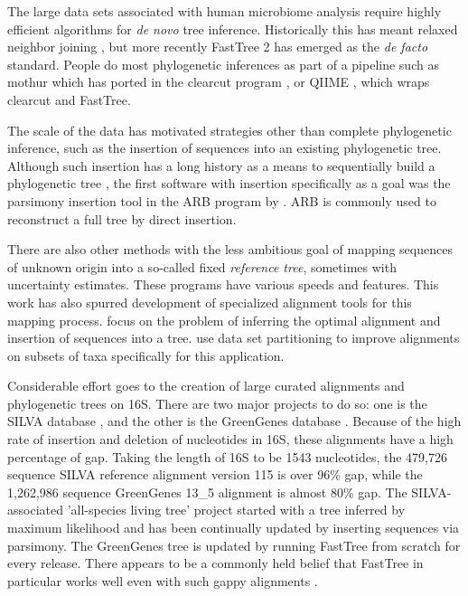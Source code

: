 \documentclass{amsart}
\begin{document}
The large data sets associated with human microbiome analysis require highly efficient algorithms for \emph{de novo} tree inference.
Historically this has meant relaxed neighbor joining \citep{evans2006relaxed}, but more recently FastTree 2 \citep{price2010fasttree} has emerged as the \textit{de facto} standard.
People do most phylogenetic inferences as part of a pipeline such as mothur \citep{schloss2009introducing} which has ported in the clearcut program \citep{sheneman2006clearcut}, or QIIME \citep{caporaso2010qiime}, which wraps clearcut and FastTree.

The scale of the data has motivated strategies other than complete phylogenetic inference, such as the insertion of sequences into an existing phylogenetic tree.
Although such insertion has a long history as a means to sequentially build a phylogenetic tree \citep{kluge1969quantitative}, the first software with insertion specifically as a goal was the parsimony insertion tool in the ARB program by \citet{ludwig2004arb}.
ARB is commonly used to reconstruct a full tree by direct insertion.

There are also other methods with the less ambitious goal of mapping sequences of unknown origin into a so-called fixed \textit{reference tree}, sometimes with uncertainty estimates.
These programs \citep{wu2008simple,monierEaLargeViruses08,vonMeringEaQuantitative08,stark2010mltreemap,matsen2010pplacer,berger2011performance} have various speeds and features.
This work has also spurred development of specialized alignment tools for this mapping process.
\citet{berger2011aligning} focus on the problem of inferring the optimal alignment and insertion of sequences into a tree.
\citet{mirarabsepp} use data set partitioning to improve alignments on subsets of taxa specifically for this application.

Considerable effort goes to the creation of large curated alignments and phylogenetic trees on 16S.
There are two major projects to do so: one is the SILVA database \citep{pruesse2007silva,quast2013silva}, and the other is the GreenGenes database \citep{desantis2006greengenes,mcdonald2011improved}.
Because of the high rate of insertion and deletion of nucleotides in 16S, these alignments have a high percentage of gap.
Taking the length of 16S to be 1543 nucleotides,
the 479,726 sequence SILVA reference alignment version 115 is over 96\% gap,
while the 1,262,986 sequence GreenGenes 13\_5 alignment is almost 80\% gap.
The SILVA-associated 'all-species living tree' project \citep{yarza2008all} started with a tree inferred by maximum likelihood and has been continually updated  by inserting sequences via parsimony.
The GreenGenes tree is updated by running FastTree from scratch for every release.
There appears to be a commonly held belief that FastTree in particular works well even with such gappy alignments \citep[e.g.][]{sharpton2011phylotu}.
\end{document}
